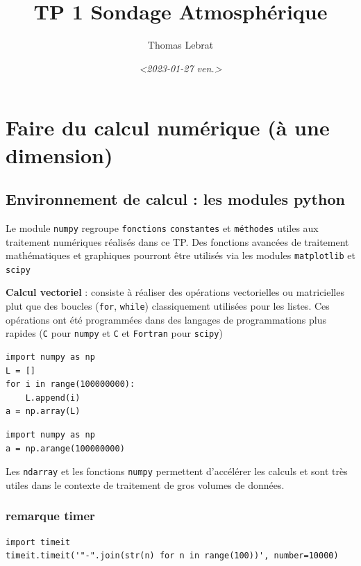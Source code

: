 \documentclass[11pt]{article}
\author{Thomas Lebrat}
\date{\textit{<2023-01-27 ven.>}}
\title{TP 1 Sondage Atmosphérique}
\begin{document}
\tableofcontents



\section{Faire du calcul numérique (à une dimension)}
\label{sec:org0a8feab}

\subsection{Environnement de calcul : les modules python}
\label{sec:org87b3263}

Le module \texttt{numpy} regroupe \texttt{fonctions} \texttt{constantes} et \texttt{méthodes} utiles aux traitement numériques réalisés dans ce TP. Des fonctions avancées de traitement mathématiques et graphiques pourront être utilisés via les modules \texttt{matplotlib} et \texttt{scipy}

\textbf{Calcul vectoriel} : consiste à réaliser des opérations vectorielles ou matricielles plut que des boucles (\texttt{for}, \texttt{while}) classiquement utilisées pour les listes. Ces opérations ont été programmées dans des langages de programmations plus rapides (\texttt{C} pour \texttt{numpy} et \texttt{C} et \texttt{Fortran} pour \texttt{scipy})


\begin{verbatim}
import numpy as np
L = []
for i in range(100000000):
    L.append(i)
a = np.array(L)
\end{verbatim}

\begin{verbatim}
import numpy as np
a = np.arange(100000000)
\end{verbatim}

Les \texttt{ndarray} et les fonctions \texttt{numpy} permettent d'accélérer les calculs et sont très utiles dans le contexte de traitement de gros volumes de données.



\subsubsection{remarque timer}
\label{sec:orged42507}

\begin{verbatim}
import timeit
timeit.timeit('"-".join(str(n) for n in range(100))', number=10000)


\end{verbatim}
\end{document}
